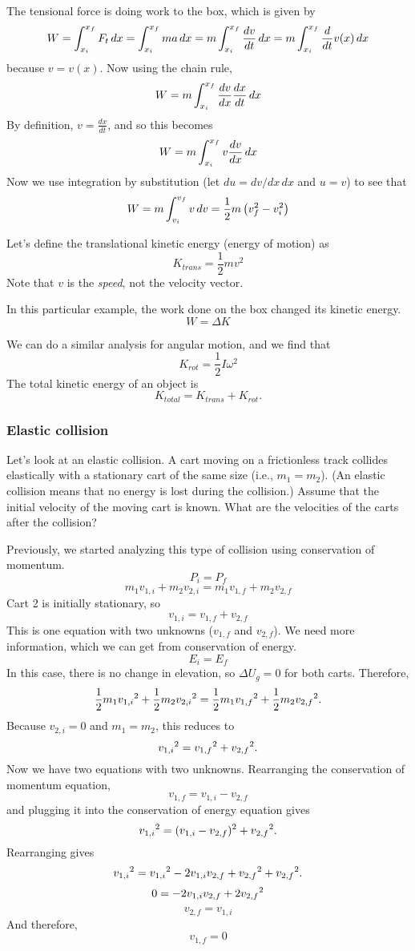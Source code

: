 The tensional force is doing work to the box, which is given by
$$W=\displaystyle\int_{x_i}^{x_f} F_t\,dx=\int_{x_i}^{x_f} ma\,dx=m\int_{x_i}^{x_f} \frac{dv}{dt}\,dx=m\int_{x_i}^{x_f} \frac{d}{dt}v(x)\,dx$$
because $v=v(x)$. Now using the chain rule,
$$W=m\displaystyle\int_{x_i}^{x_f}\frac{dv}{dx}\frac{dx}{dt}\,dx$$
By definition, $v=\frac{dx}{dt}$, and so this becomes
$$W=m\displaystyle\int_{x_i}^{x_f} v\frac{dv}{dx}\,dx$$
Now we use integration by substitution (let $du=dv/dx\,dx$ and $u=v$) to see that
$$W=m\displaystyle\int_{v_i}^{v_f}v\,dv=\frac{1}{2}m\left(v_f^2-v_i^2\right)$$

Let's define the translational kinetic energy (energy of motion) as
$$\boxed{K_{trans}=\frac{1}{2}mv^2}$$
Note that $v$ is the \textit{speed}, not the velocity vector. 

In this particular example, the work done on the box changed its kinetic energy.
$$W=\Delta{K}$$

We can do a similar analysis for angular motion, and we find that
$$\boxed{K_{rot}=\frac{1}{2}I\omega^2}$$
The total kinetic energy of an object is
$$K_{total}=K_{trans}+K_{rot}.$$


\subsubsection{Elastic collision}
Let's look at an elastic collision. A cart moving on a frictionless track collides elastically with a stationary cart of the same size (i.e., $m_1=m_2$). (An elastic collision means that no energy is lost during the collision.) Assume that the initial velocity of the moving cart is known. What are the velocities of the carts after the collision?

Previously, we started analyzing this type of collision using conservation of momentum.
$$P_i=P_f$$
$$m_1v_{1,i}+m_2v_{2,i}=m_1v_{1,f}+m_2v_{2,f}$$
Cart 2 is initially stationary, so
$$v_{1,i}=v_{1,f}+v_{2,f}$$
This is one equation with two unknowns ($v_{1,f}$ and $v_{2,f}$). We need more information, which we can get from conservation of energy.
$$E_i=E_f$$
In this case, there is no change in elevation, so $\Delta{U_g}=0$ for both carts. Therefore, 
$$\frac{1}{2}m_1v_{1,i}\displaystyle^2+\frac{1}{2}m_2v_{2,i}\displaystyle^2=\frac{1}{2}m_1v_{1,f}\displaystyle^2+\frac{1}{2}m_2v_{2,f}\displaystyle^2.$$
Because $v_{2,i}=0$ and $m_1=m_2$, this reduces to
$$v_{1,i}\displaystyle^2=v_{1,f}\displaystyle^2+v_{2,f}\displaystyle^2.$$
Now we have two equations with two unknowns. Rearranging the conservation of momentum equation,
$$v_{1,f}=v_{1,i}-v_{2,f}$$
and plugging it into the conservation of energy equation gives
$$v_{1,i}\displaystyle^2=(v_{1,i}-v_{2,f})\displaystyle^2+v_{2,f}\displaystyle^2.$$
Rearranging gives
$$v_{1,i}\displaystyle^2=v_{1,i}\displaystyle^2-2v_{1,i}v_{2,f}+v_{2,f}\displaystyle^2+v_{2,f}\displaystyle^2.$$
$$0=-2v_{1,i}v_{2,f}+2v_{2,f}\displaystyle^2$$
$$\boxed{v_{2,f}=v_{1,i}}$$
And therefore,
$$\boxed{v_{1,f}=0}$$

